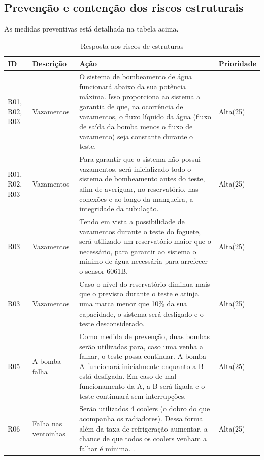 \subsection{Prevenção e contenção dos riscos estruturais}

As medidas preventivas está detalhada na tabela acima.

\begin{table}[!h]
    \centering
    \begin{tabular}{|p{1cm}|p{2cm}|p{7cm}|p{2cm}|}
        \hline
        \textbf{ID}  & \textbf{Descrição} & \textbf{Ação} & \textbf{Prioridade} \\ \hline
        R01, R02, R03 & Vazamentos & O sistema de bombeamento de água funcionará abaixo da sua potência máxima. Isso proporciona ao sistema a garantia de que, na ocorrência de vazamentos, o fluxo líquido da água (fluxo de saída da bomba menos o fluxo de vazamento) seja constante durante o teste. & Alta(25) \\ \hline
        R01, R02, R03 & Vazamentos & Para garantir que o sistema não possui vazamentos, será inicializado todo o sistema de bombeamento antes do teste, afim de averiguar, no reservatório, nas conexões e ao longo da mangueira, a integridade da tubulação. & Alta(25) \\ \hline
        R03 & Vazamentos & Tendo em vista a possibilidade de vazamentos durante o teste do foguete, será utilizado um reservatório maior que o necessário, para garantir ao sistema o mínimo de água necessária para arrefecer o sensor 6061B. & Alta(25) \\ \hline
        R03 & Vazamentos & Caso o nível do reservatório diminua mais que o previsto durante o teste e atinja uma marca menor que 10\% da sua capacidade, o sistema será desligado e o teste desconsiderado. & Alta(25) \\ \hline        
        R05 & A bomba falha & Como medida de prevenção, duas bombas serão utilizadas para, caso uma venha a falhar, o teste possa continuar. A bomba A funcionará inicialmente enquanto a B está desligada. Em caso de mal funcionamento da A, a B será ligada e o teste continuará sem interrupções.  & Alta(25) \\ \hline
        R06 & Falha nas ventoinhas & Serão utilizados 4 coolers (o dobro do que acompanha os radiadores). Dessa forma além da taxa de refrigeração aumentar, a chance de que todos os coolers venham a falhar é mínima. . & Alta(25) \\ \hline
    \end{tabular}
\caption{Resposta aos riscos de estruturas}
\end{table}

